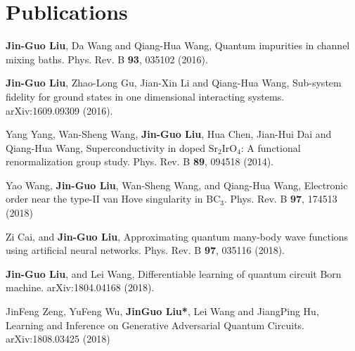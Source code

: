 \documentclass[letterpaper]{article}
\renewenvironment{itemize}{
  \begin{list}{}{
    \setlength{\leftmargin}{1.5em}
  }
}{
  \end{list}
}
\begin{document}
\section*{Publications}
\begin{itemize}
    \item [1] {\bf Jin-Guo Liu}, Da Wang and Qiang-Hua Wang, Quantum impurities in channel mixing baths. Phys. Rev. B {\bf 93}, 035102 (2016).
    \item [2] {\bf Jin-Guo Liu}, Zhao-Long Gu, Jian-Xin Li and Qiang-Hua Wang, Sub-system fidelity for ground states in one dimensional interacting systems. arXiv:1609.09309 (2016).
    \item [3] Yang Yang, Wan-Sheng Wang, {\bf Jin-Guo Liu}, Hua Chen, Jian-Hui Dai and Qiang-Hua Wang, Superconductivity in doped ${\mathrm{Sr}}_{2}{\mathrm{IrO}}_{4}$: A functional renormalization group study. Phys. Rev. B {\bf 89}, 094518 (2014).
    \item [4] Yao Wang, {\bf Jin-Guo Liu}, Wan-Sheng Wang, and Qiang-Hua Wang, Electronic order near the type-II van Hove singularity in BC${}_3$. Phys. Rev. B {\bf 97}, 174513 (2018)
    \item [5] Zi Cai, and {\bf Jin-Guo Liu}, Approximating quantum many-body wave functions using artificial neural networks. Phys. Rev. B {\bf 97}, 035116 (2018).
    \item [6] {\bf Jin-Guo Liu}, and Lei Wang, Differentiable learning of quantum circuit Born machine. arXiv:1804.04168 (2018).
    \item [7] JinFeng Zeng, YuFeng Wu, {\bf JinGuo Liu*}, Lei Wang and JiangPing Hu, Learning and Inference on Generative Adversarial Quantum Circuits.  arXiv:1808.03425 (2018)
\end{itemize}
\end{document}
